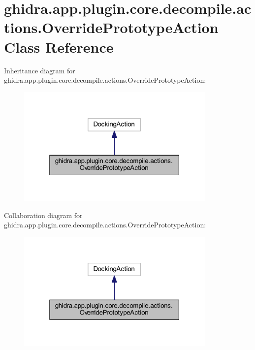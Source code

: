 \hypertarget{classghidra_1_1app_1_1plugin_1_1core_1_1decompile_1_1actions_1_1_override_prototype_action}{}\section{ghidra.\+app.\+plugin.\+core.\+decompile.\+actions.\+Override\+Prototype\+Action Class Reference}
\label{classghidra_1_1app_1_1plugin_1_1core_1_1decompile_1_1actions_1_1_override_prototype_action}


Inheritance diagram for ghidra.\+app.\+plugin.\+core.\+decompile.\+actions.\+Override\+Prototype\+Action\+:
\nopagebreak
\begin{figure}[H]
\begin{center}
\leavevmode
\includegraphics[width=277pt]{classghidra_1_1app_1_1plugin_1_1core_1_1decompile_1_1actions_1_1_override_prototype_action__inherit__graph}
\end{center}
\end{figure}


Collaboration diagram for ghidra.\+app.\+plugin.\+core.\+decompile.\+actions.\+Override\+Prototype\+Action\+:
\nopagebreak
\begin{figure}[H]
\begin{center}
\leavevmode
\includegraphics[width=277pt]{classghidra_1_1app_1_1plugin_1_1core_1_1decompile_1_1actions_1_1_override_prototype_action__coll__graph}
\end{center}
\end{figure}
